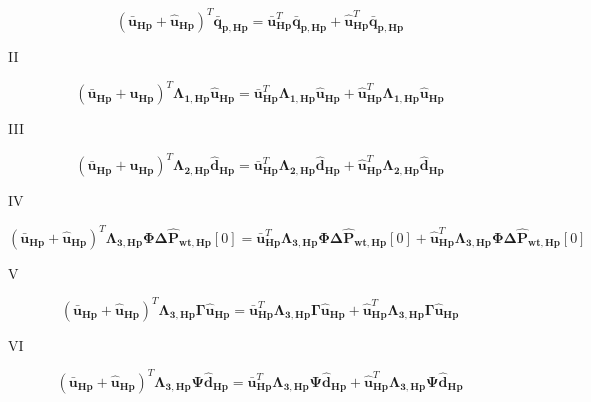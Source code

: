 \begin{equation}
 ({\bm{\bar{u}}}_{\bm{Hp}} + {\bm{\hat{u}}}_{\bm{Hp}})^{T} \bm{\bar{q}}_{\bm{p,Hp}}  = {\bm{\bar{u}}}_{\bm{Hp}}^{T} \bm{\bar{q}}_{\bm{p,Hp}} + {\bm{\hat{u}}}_{\bm{Hp}}^{T} \bm{\bar{q}}_{\bm{p,Hp}}
\end{equation}

\RN{2}

\begin{equation}
 ({\bm{\bar{u}}}_{\bm{Hp}} + {\bm{\hat{u}}}_{\bm{Hp}})^{T} {\bm{\Lambda}}_{\bm{1,Hp}}{\bm{\hat{u}}_{\bm{Hp}}}  = {\bm{\bar{u}}}_{\bm{Hp}}^{T} {\bm{\Lambda}}_{\bm{1,Hp}} {\bm{\hat{u}}_{\bm{Hp}}} + {\bm{\hat{u}}}_{\bm{Hp}}^{T} {\bm{\Lambda}}_{\bm{1,Hp}} {\bm{\hat{u}}_{\bm{Hp}}} 
\end{equation}

\RN{3}

\begin{equation}
 ({\bm{\bar{u}}}_{\bm{Hp}} + {\bm{\hat{u}}}_{\bm{Hp}})^{T} {\bm{\Lambda}}_{\bm{2,Hp}} {\bm{\hat{d}}}_{\bm{Hp}}  = {\bm{\bar{u}}}_{\bm{Hp}}^{T} {\bm{\Lambda}}_{\bm{2,Hp}} {\bm{\hat{d}}_{\bm{Hp}}} 
 + {\bm{\hat{u}}}_{\bm{Hp}}^{T} {\bm{\Lambda}}_{\bm{2,Hp}} {\bm{\hat{d}}_{\bm{Hp}}}  
\end{equation}

\RN{4}

\begin{equation}
 ({\bm{\bar{u}}}_{\bm{Hp}} + {\bm{\hat{u}}}_{\bm{Hp}})^{T} {\bm{\Lambda}}_{\bm{3,Hp}} \bm{\Phi} \bm{\Delta \hat{P}_{\bm{wt,Hp}}}[0]   =  {\bm{\bar{u}}}_{\bm{Hp}}^{T} {\bm{\Lambda}}_{\bm{3,Hp}} \bm{\Phi} \bm{\Delta \hat{P}_{\bm{wt,Hp}}}[0] + 
 {\bm{\hat{u}}}_{\bm{Hp}}^{T} {\bm{\Lambda}}_{\bm{3,Hp}} \bm{\Phi} \bm{\Delta \hat{P}_{\bm{wt,Hp}}}[0]  
\end{equation}

\RN{5}

\begin{equation}
 ({\bm{\bar{u}}}_{\bm{Hp}} + {\bm{\hat{u}}}_{\bm{Hp}})^{T} {\bm{\Lambda}}_{\bm{3,Hp}} \bm{\Gamma} \bm{\hat{u}}_{\bm{Hp}}   =  {\bm{\bar{u}}}_{\bm{Hp}}^{T} {\bm{\Lambda}}_{\bm{3,Hp}} {\bm{\Gamma}} \bm{\hat{u}}_{\bm{Hp}} + 
 {\bm{\hat{u}}}_{\bm{Hp}}^{T} {\bm{\Lambda}}_{\bm{3,Hp}} \bm{\Gamma} \bm{\hat{u}}_{\bm{Hp}} 
\end{equation}

\RN{6}

\begin{equation}
 ({\bm{\bar{u}}}_{\bm{Hp}} + {\bm{\hat{u}}}_{\bm{Hp}})^{T} {\bm{\Lambda}}_{\bm{3,Hp}} \bm{\Psi} \bm{\hat{d}}_{\bm{Hp}}   =  {\bm{\bar{u}}}_{\bm{Hp}}^{T} {\bm{\Lambda}}_{\bm{3,Hp}} {\bm{\Psi}} \bm{\hat{d}}_{\bm{Hp}} + 
 {\bm{\hat{u}}}_{\bm{Hp}}^{T} {\bm{\Lambda}}_{\bm{3,Hp}} \bm{\Psi} \bm{\hat{d}}_{\bm{Hp}} 
 \label{obj_12}
\end{equation}

